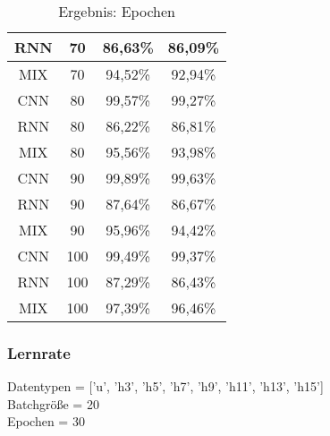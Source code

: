 \begin{table}[H]
\begin{tabular}{|c|c|c|c|}
                \hline
                RNN & 70 &  86,63\% & 86,09\%  \\ 
                \hline
                MIX & 70 &  94,52\% & 92,94\%  \\ 
                \hline
                \hline
                CNN & 80 &  99,57\% & 99,27\%  \\ 
                \hline
                RNN & 80 &  86,22\% & 86,81\%  \\ 
                \hline
                MIX & 80 &  95,56\% & 93,98\%  \\ 
                \hline
                \hline
                CNN & 90 &  99,89\% & 99,63\%  \\ 
                \hline
                RNN & 90 &  87,64\% & 86,67\%  \\ 
                \hline
                MIX & 90 &  95,96\% & 94,42\%  \\ 
                \hline
                \hline
                CNN & 100 & 99,49\% & 99,37\%  \\ 
                \hline
                RNN & 100 & 87,29\% & 86,43\%  \\ 
                \hline
                MIX & 100 & 97,39\% & 96,46\% \\
                \hline

            \end{tabular}
            \caption{Ergebnis: Epochen}
            \label{tabl:ErgebnisEpoch}
        \end{table}

    \subsubsection{Lernrate}

        Datentypen = ['u', 'h3', 'h5', 'h7', 'h9', 'h11', 'h13', 'h15']\\
        \noindent
        Batchgröße = 20\\
        \noindent
        Epochen = 30\\

